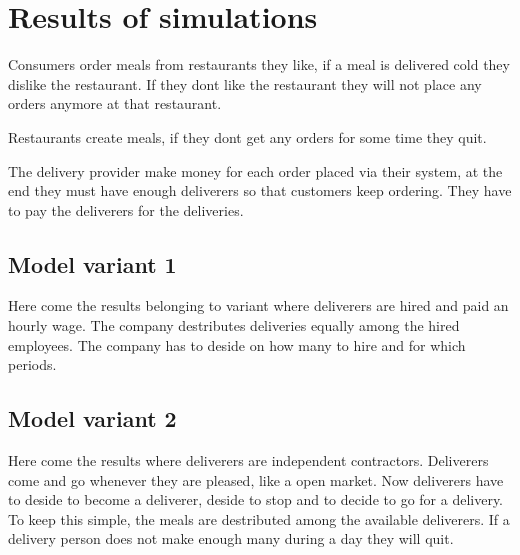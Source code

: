 \section{Results of simulations}\label{sec:results-of-simulations}


Consumers order meals from restaurants they like, if a meal is delivered cold they dislike the restaurant.
If they dont like the restaurant they will not place any orders anymore at that restaurant.

Restaurants create meals, if they dont get any orders for some time they quit.

The delivery provider make money for each order placed via their system, at the end they must have enough deliverers so that
customers keep ordering.
They have to pay the deliverers for the deliveries.



\subsection{Model variant 1}
Here come the results belonging to variant where deliverers are hired and paid an hourly wage.
The company destributes deliveries equally among the hired employees.
The company has to deside on how many to hire and for which periods.


\subsection{Model variant 2}
Here come the results where deliverers are independent contractors.
Deliverers come and go whenever they are pleased, like a open market.
Now deliverers have to deside to become a deliverer, deside to stop and to decide to go for a delivery.
To keep this simple, the meals are destributed among the available deliverers.
If a delivery person does not make enough many during a day they will quit.
